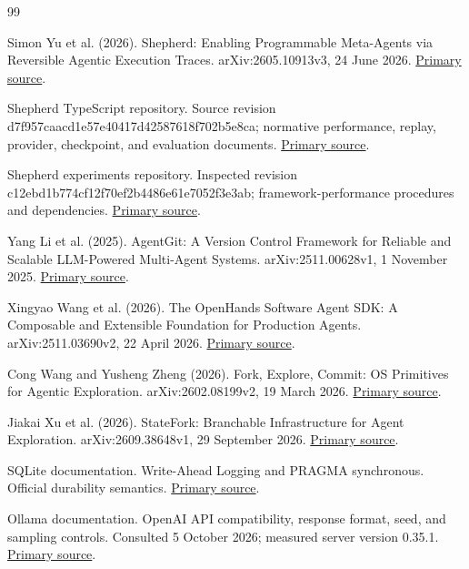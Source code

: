 \documentclass[11pt,a4paper]{article}
\begin{document}
\begin{thebibliography}{99}

 Simon Yu et al. (2026). Shepherd: Enabling Programmable Meta-Agents via Reversible Agentic Execution Traces. arXiv:2605.10913v3, 24 June 2026. \href{https://arxiv.org/html/2605.10913v3}{Primary source}.

 Shepherd TypeScript repository. Source revision d7f957caacd1e57e40417d42587618f702b5e8ca; normative performance, replay, provider, checkpoint, and evaluation documents. \href{https://github.com/avnionur/shepherd-typescript/tree/d7f957caacd1e57e40417d42587618f702b5e8ca}{Primary source}.

 Shepherd experiments repository. Inspected revision c12ebd1b774cf12f70ef2b4486e61e7052f3e3ab; framework-performance procedures and dependencies. \href{https://github.com/shepherd-agents/shepherd-experiments/tree/c12ebd1b774cf12f70ef2b4486e61e7052f3e3ab/exp/framework-perf}{Primary source}.

 Yang Li et al. (2025). AgentGit: A Version Control Framework for Reliable and Scalable LLM-Powered Multi-Agent Systems. arXiv:2511.00628v1, 1 November 2025. \href{https://arxiv.org/abs/2511.00628v1}{Primary source}.

 Xingyao Wang et al. (2026). The OpenHands Software Agent SDK: A Composable and Extensible Foundation for Production Agents. arXiv:2511.03690v2, 22 April 2026. \href{https://arxiv.org/abs/2511.03690v2}{Primary source}.

 Cong Wang and Yusheng Zheng (2026). Fork, Explore, Commit: OS Primitives for Agentic Exploration. arXiv:2602.08199v2, 19 March 2026. \href{https://arxiv.org/abs/2602.08199v2}{Primary source}.

 Jiakai Xu et al. (2026). StateFork: Branchable Infrastructure for Agent Exploration. arXiv:2609.38648v1, 29 September 2026. \href{https://arxiv.org/abs/2609.38648v1}{Primary source}.

 SQLite documentation. Write-Ahead Logging and PRAGMA synchronous. Official durability semantics. \href{https://sqlite.org/pragma.html#pragma_synchronous}{Primary source}.

 Ollama documentation. OpenAI API compatibility, response format, seed, and sampling controls. Consulted 5 October 2026; measured server version 0.35.1. \href{https://github.com/ollama/ollama/blob/main/docs/api/openai-compatibility.mdx}{Primary source}.

\end{thebibliography}
\end{document}
